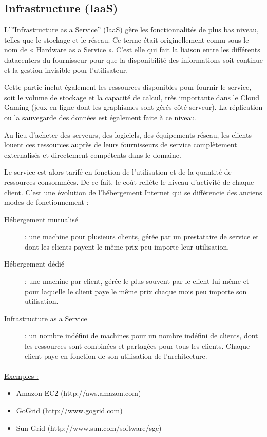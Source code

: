 \documentclass[a4paper,12pt]{report}
\begin{document}
\begin{onehalfspace}
	\subsection{Infrastructure (IaaS)}
	L’”Infrastructure as a Service” (IaaS) gère les fonctionnalités de plus bas niveau, telles que le stockage et le réseau. Ce terme était originellement connu sous le nom de « Hardware as a Service ». C’est elle qui fait la liaison entre les différents datacenters du fournisseur pour que la disponibilité des informations soit continue et la gestion invisible pour l’utilisateur.
	
	Cette partie inclut également les ressources disponibles pour fournir le service, soit le volume de stockage et la capacité de calcul, très importante dans le Cloud Gaming (jeux en ligne dont les graphismes sont gérés côté serveur). La réplication ou la sauvegarde des données est également faite à ce niveau.
	
	Au lieu d’acheter des serveurs, des logiciels, des équipements réseau, les clients louent ces ressources auprès de leurs fournisseurs de service complètement externalisés et directement compétents dans le domaine.
	
	Le service est alors tarifé en fonction de l'utilisation et de la quantité de ressources consommées. De ce fait, le coût reflète le niveau d'activité de chaque client. C'est une évolution de l'hébergement Internet qui se différencie des anciens modes de fonctionnement :
	
	\begin{description}
		\item[Hébergement mutualisé] : une machine pour plusieurs clients, gérée par un prestataire de service et dont les clients payent le même prix peu importe leur utilisation.
		\item[Hébergement dédié] : une machine par client, gérée le plus souvent par le client lui même et pour laquelle le client paye le même prix chaque mois peu importe son utilisation.
		\item[Infrastructure as a Service] : un nombre indéfini de machines pour un nombre indéfini de clients, dont les ressources sont combinées et partagées pour tous les clients. Chaque client paye en fonction de son utilisation de l'architecture.
	\end{description}
	
	\paragraph*{}
	\underline{Exemples :}
	\begin{itemize}
		\item Amazon EC2 (http://aws.amazon.com)
		\item GoGrid (http://www.gogrid.com)
		\item Sun Grid (http://www.sun.com/software/sge)
	\end{itemize}
	

\end{onehalfspace}
\end{document}
